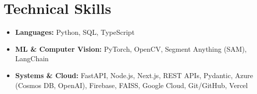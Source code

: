 \documentclass[11pt,letterpaper]{article}
\begin{document}
\section*{Technical Skills}
\vspace{-0.5ex}
\begin{itemize}[leftmargin=1.15em]
    \item \textbf{Languages:} Python, SQL, TypeScript
    \item \textbf{ML \& Computer Vision:} PyTorch, OpenCV, Segment Anything (SAM), LangChain
    \item \textbf{Systems \& Cloud:} FastAPI, Node.js, Next.js, REST APIs, Pydantic, Azure (Cosmos DB, OpenAI), Firebase, FAISS, Google Cloud, Git/GitHub, Vercel
\end{itemize}
 
 
\end{document}
